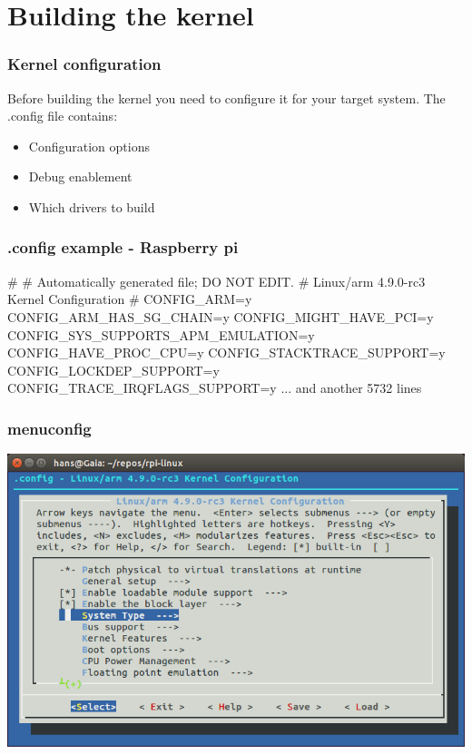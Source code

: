 \documentclass{beamer}
\begin{document}
\section{Building the kernel}

\begin{frame}
\frametitle{Kernel configuration}
Before building the kernel you need to configure it for your target system.
The .config file contains:
\begin{itemize}
	\item Configuration options
	\item Debug enablement
	\item Which drivers to build
\end{itemize}
\end{frame}

\begin{frame}[fragile]
\frametitle{.config example - Raspberry pi}
\begin{semiverbatim}
#
# Automatically generated file; DO NOT EDIT.
# Linux/arm 4.9.0-rc3 Kernel Configuration
#
CONFIG_ARM=y
CONFIG_ARM_HAS_SG_CHAIN=y
CONFIG_MIGHT_HAVE_PCI=y
CONFIG_SYS_SUPPORTS_APM_EMULATION=y
CONFIG_HAVE_PROC_CPU=y
CONFIG_STACKTRACE_SUPPORT=y
CONFIG_LOCKDEP_SUPPORT=y
CONFIG_TRACE_IRQFLAGS_SUPPORT=y
... and another 5732 lines
\end{semiverbatim}
\end{frame}

\begin{frame}
\frametitle{menuconfig}
\includegraphics[width=\textwidth]{media/menuconfig.png}
\end{frame}
\end{document}
